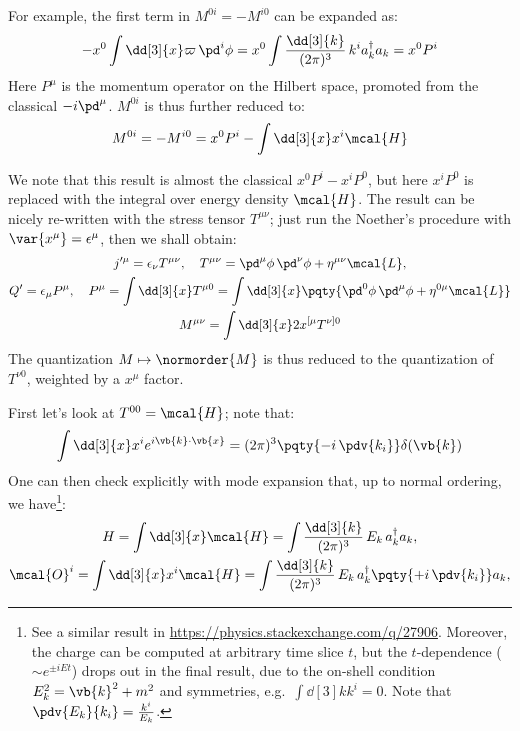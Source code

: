 \documentclass[a4paper,10pt]{article}
\begin{document}
\begin{itemize}
	For example, the first term in $M^{0i} = -M^{i0}$ can be expanded as:
	\begin{equation}
	\begin{aligned}
		- x^0 \int \dd[3]{x}
			\varpi\,\pd^i \phi
		= x^0 \int \frac{\dd[3]{k}}{(2\pi)^3}\,
				k^i a^\dagger_k a_k
		= x^0 P^i
	\end{aligned}
	\end{equation}
	Here $P^\mu$ is the momentum operator on the Hilbert space, promoted from the classical $-i\pd^\mu$. $M^{0i}$ is thus further reduced to:
	\begin{equation}
		M^{0i} = -M^{i0}
		= x^0 P^i - \int \dd[3]{x}
			x^i \mcal{H}
	\end{equation}
	
	We note that this result is almost the classical $
		x^0 P^i - x^i P^0
	$, but here $x^i P^0$ is replaced with the integral over energy density $\mcal{H}$. The result can be nicely re-written with the stress tensor $T^{\mu\nu}$; just run the Noether's procedure with $\var{x^\mu} = \epsilon^\mu$, then we shall obtain:
	\begin{equation}
	\begin{gathered}
		j'^\mu
		= \epsilon_\nu T^{\mu\nu},
	\quad
		T^{\mu\nu}
		= \pd^\mu\phi\,\pd^\nu\phi
			+ \eta^{\mu\nu} \mcal{L},
	\\
		Q' = \epsilon_\mu P^\mu,
	\quad
		P^\mu
		= \int \dd[3]{x} T^{\mu 0}
		= \int \dd[3]{x} \pqty{
			\pd^0\phi\,\pd^\mu\phi
			+ \eta^{0\mu} \mcal{L}
		}
	\\
		M^{\mu\nu}
		= \int \dd[3]{x}
			2x^{[\mu} T^{\nu]0}
	\end{gathered}
	\end{equation}
	The quantization $M\mapsto \normorder{M}$ is thus reduced to the quantization of $T^{\nu 0}$, weighted by a $x^\mu$ factor. 
	
	First let's look at $T^{00} = \mcal{H}$; note that:
	\begin{equation}
		\int \dd[3]{x}
			x^i e^{i\vb{k}\cdot\vb{x}}
		= (2\pi)^3 \pqty{
				-i\,\pdv{k_i}
			} \delta(\vb{k})
	\end{equation}
	One can then check explicitly with mode expansion that, up to normal ordering, we have\footnote{
		See a similar result in \url{https://physics.stackexchange.com/q/27906}. Moreover, the charge can be computed at arbitrary time slice $t$, but the $t$-dependence ($\sim e^{\pm iEt}$) drops out in the final result, due to the on-shell condition $E_k^2 = \vb{k}^2 + m^2$ and symmetries, e.g.\ $\int \dd[3]{k} k^i = 0$. Note that $\pdv{E_k}{k_i} = \frac{k^i}{E_k}$. 
	}:
	\begin{gather}
		H = \int \dd[3]{x} \mcal{H}
		= \int \frac{\dd[3]{k}}{(2\pi)^3}\,
			E_k\, a^\dagger_k a_k,
	\\
		\mcal{O}^i = \int \dd[3]{x} x^i \mcal{H}
		= \int \frac{\dd[3]{k}}{(2\pi)^3}\,
			E_k\, a^\dagger_k
				\pqty{+i\,\pdv{k_i}}
			a_k,
	\end{gather}
	

\end{itemize}
\end{document}
